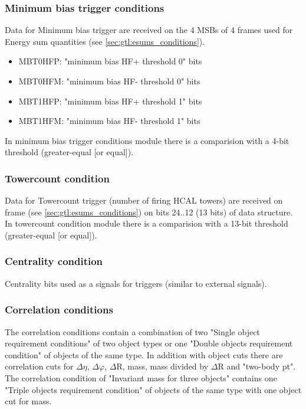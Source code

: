 \clearpage

\subsubsection{Minimum bias trigger conditions}
\label{sec:gtl:min_bias_conditions}

Data for Minimum bias trigger are received on the 4 MSBs of 4 frames used for Energy sum quantities (see \ref{sec:gtl:esums_conditions}).

\begin{itemize}
\item MBT0HFP: "minimum bias HF+ threshold 0" bits
\item MBT0HFM: "minimum bias HF- threshold 0" bits
\item MBT1HFP: "minimum bias HF+ threshold 1" bits
\item MBT1HFM: "minimum bias HF- threshold 1" bits
\end{itemize}

In minimum bias trigger conditions module there is a comparision with a 4-bit threshold (greater-equal [or equal]).

\subsubsection{Towercount condition}
\label{sec:gtl:towercount_cond}

Data for Towercount trigger (number of firing HCAL towers) are received on frame \htt (see \ref{sec:gtl:esums_conditions}) on bits 24..12 (13 bits) of \htt data structure.\\
In towercount condition module there is a comparision with a 13-bit threshold (greater-equal [or equal]).

\subsubsection{Centrality condition}
\label{sec:gtl:centrality_cond}

Centrality bits used as a signals for triggers (similar to external signals).

\clearpage

\subsubsection{Correlation conditions}
\label{sec:gtl:correlation_conditions}

The correlation conditions contain a combination of two "Single object requirement conditions" of two object types or one "Double objects requirement condition" of objects of the same type. In addition with object cuts there are correlation cuts for $\Delta\eta$, $\Delta\varphi$, $\Delta$R, mass, mass divided by $\Delta$R and "two-body pt".\\
The correlation condition of "Invariant mass for three objects" contains one "Triple objects requirement condition" of objects of the same type with one object cut for mass.

